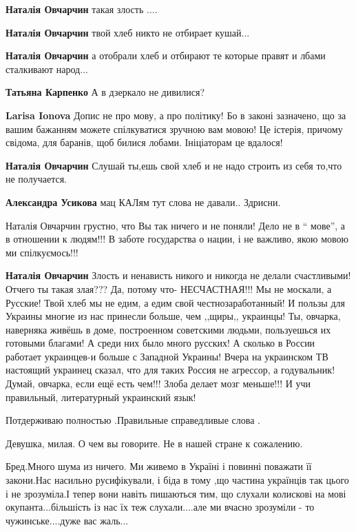 \begin{itemize}
{\begin{itemize}
\textbf{Наталія Овчарчин} такая злость ....

\textbf{Наталія Овчарчин} твой хлеб никто не отбирает кушай...

\textbf{Наталія Овчарчин} а отобрали хлеб и отбирают те которые правят и лбами сталкивают народ...

\textbf{Татьяна Карпенко} А в дзеркало не дивилися?

\textbf{Larisa Ionova} Допис не про мову, а про політику! Бо в законі
зазначено, що за вашим бажанням можете спілкуватися зручною вам мовою! Це
істерія, причому свідома, для баранів, щоб билися лобами. Ініціаторам це
вдалося!

\textbf{Наталія Овчарчин} Слушай ты,ешь свой хлеб и не надо строить из себя то,что не получается.

\textbf{Александра Усикова} мац КАЛям тут слова не давали.. Здрисни.

Наталія Овчарчин грустно, что Вы так ничего и не поняли! Дело не в \enquote{ мове}, а в
отношении к людям!!! В заботе государства о нации, і не важливо, якою мовою ми
спілкуємось!!!

\textbf{Наталія Овчарчин} Злость и ненависть никого и никогда не делали
счастливыми! Отчего ты такая злая??? Да, потому что- НЕСЧАСТНАЯ!!! Мы не
москали, а Русские! Твой хлеб мы не едим, а едим свой честнозаработанный! И
пользы для Украины многие из нас принесли больше, чем ,,щиры,, украинцы! Ты,
овчарка, наверняка живёшь в доме, построенном советскими людьми, пользуешься их
готовыми благами! А среди них было много русских! А сколько в России работает
украинцев-и больше с Западной Украины! Вчера на украинском ТВ настоящий
украинец сказал, что для таких Россия не агрессор, а годувальник! Думай,
овчарка, если ещё есть чем!!! Злоба делает мозг меньше!!! И учи правильный,
литературный украинский язык!
\end{itemize}


Потдерживаю полностью .Правильные справедливые слова .


Девушка, милая. О чем вы говорите. Не в нашей стране к сожалению.


Бред.Много шума из ничего. Ми живемо в Україні і повинні поважати її закони.Нас
насильно русифікували, і біда в тому ,що частина українців так цього і не
зрозуміла.І тепер вони навіть пишаються тим, що слухали колискові на мові
окупанта...більшість із нас їх теж слухали....але ми вчасно зрозуміли - то
чужинське....дуже вас жаль...

}
\end{itemize}
